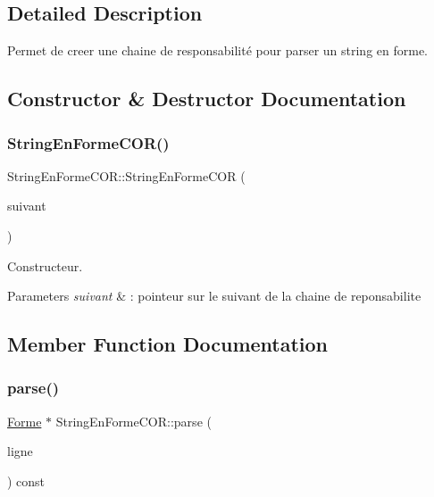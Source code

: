 \subsection{Detailed Description}
Permet de creer une chaine de responsabilité pour parser un string en forme. 

\subsection{Constructor \& Destructor Documentation}
\mbox{\label{class_string_en_forme_c_o_r_a5fc0f41132d65a076009ddc5c4a8b1ee}} 
\subsubsection{\texorpdfstring{StringEnFormeCOR()}{StringEnFormeCOR()}}
{\footnotesize\ttfamily String\+En\+Forme\+C\+O\+R\+::\+String\+En\+Forme\+C\+OR (\begin{DoxyParamCaption}\item[{\mbox{\hyperlink{class_string_en_forme_c_o_r}{String\+En\+Forme\+C\+OR}} $\ast$}]{suivant }\end{DoxyParamCaption})\hspace{0.3cm}{\ttfamily [inline]}}



Constructeur. 


\begin{DoxyParams}{Parameters}
{\em suivant} & \+: pointeur sur le suivant de la chaine de reponsabilite \\
\hline
\end{DoxyParams}


\subsection{Member Function Documentation}
\mbox{\label{class_string_en_forme_c_o_r_ab0b1d2efc8fdcf027cbc7241c498a024}} 
\subsubsection{\texorpdfstring{parse()}{parse()}}
{\footnotesize\ttfamily \mbox{\hyperlink{class_forme}{Forme}} $\ast$ String\+En\+Forme\+C\+O\+R\+::parse (\begin{DoxyParamCaption}\item[{const string \&}]{ligne }\end{DoxyParamCaption}) const\hspace{0.3cm}{\ttfamily [virtual]}}



